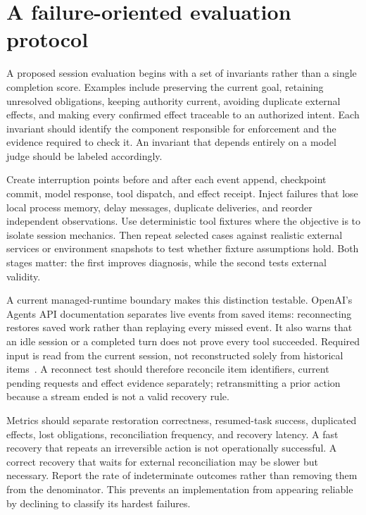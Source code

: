 \section{A failure-oriented evaluation protocol}\label{sec:C13:evaluation}
A proposed session evaluation begins with a set of invariants rather than a single completion score. Examples include preserving the current goal, retaining unresolved obligations, keeping authority current, avoiding duplicate external effects, and making every confirmed effect traceable to an authorized intent. Each invariant should identify the component responsible for enforcement and the evidence required to check it. An invariant that depends entirely on a model judge should be labeled accordingly.

Create interruption points before and after each event append, checkpoint commit, model response, tool dispatch, and effect receipt. Inject failures that lose local process memory, delay messages, duplicate deliveries, and reorder independent observations. Use deterministic tool fixtures where the objective is to isolate session mechanics. Then repeat selected cases against realistic external services or environment snapshots to test whether fixture assumptions hold. Both stages matter: the first improves diagnosis, while the second tests external validity.

A current managed-runtime boundary makes this distinction testable. OpenAI's Agents API documentation separates live events from saved items: reconnecting restores saved work rather than replaying every missed event. It also warns that an idle session or a completed turn does not prove every tool succeeded. Required input is read from the current session, not reconstructed solely from historical items~\cite{cumb2026openaievents}. A reconnect test should therefore reconcile item identifiers, current pending requests and effect evidence separately; retransmitting a prior action because a stream ended is not a valid recovery rule.

Metrics should separate restoration correctness, resumed-task success, duplicated effects, lost obligations, reconciliation frequency, and recovery latency. A fast recovery that repeats an irreversible action is not operationally successful. A correct recovery that waits for external reconciliation may be slower but necessary. Report the rate of indeterminate outcomes rather than removing them from the denominator. This prevents an implementation from appearing reliable by declining to classify its hardest failures.

